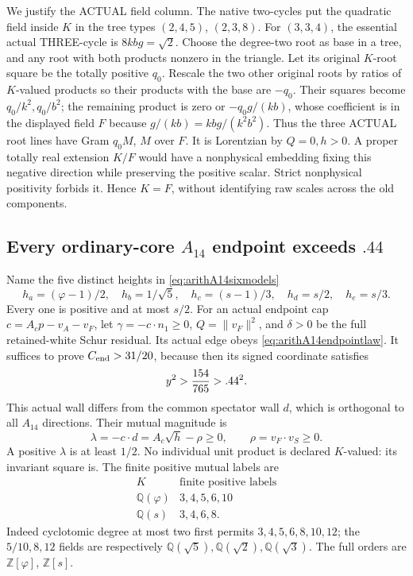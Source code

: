 We justify the ACTUAL field column.
The native two-cycles put the quadratic
field inside \(K\) in the tree types
\((2,4,5)\), \((2,3,8)\).
For \((3,3,4)\), the essential actual
THREE-cycle is \(8kbg=\sqrt2\).
Choose the degree-two root as base in a
tree, and any root with both products
nonzero in the triangle.
Let its original \(K\)-root square be
the totally positive \(q_0\).
Rescale the two other original roots by
ratios of \(K\)-valued products so their
products with the base are \(-q_0\).
Their squares become \(q_0/k^2,q_0/b^2\);
the remaining product is zero or
\(-q_0g/(kb)\), whose coefficient is in
the displayed field \(F\) because
\(g/(kb)=kbg/(k^2b^2)\).
Thus the three ACTUAL root lines have
Gram \(q_0M\), \(M\) over \(F\).
It is Lorentzian by \(Q=0,h>0\).
A proper totally real extension \(K/F\)
would have a nonphysical embedding fixing
this negative direction while preserving
the positive scalar.
Strict nonphysical positivity forbids it.
Hence \(K=F\), without identifying raw
scales across the old components.

\subsection{Every ordinary-core \(A_{14}\) endpoint exceeds \(.44\)}
\label{app:arithA14ordinaryends}

Name the five distinct heights in
\eqref{eq:arithA14sixmodels}
\[
 h_a=(\varphi-1)/2,\quad h_b=1/\sqrt5,\quad
 h_c=(s-1)/3,\quad h_d=s/2,\quad h_e=s/3 .
\]
Every one is positive and at most \(s/2\).
For an actual endpoint cap
\(c=A_cp-v_A-v_F\), let
\(\gamma=-c\cdot n_1\ge0\),
\(Q=\|v_F\|^2\), and \(\delta>0\)
be the full retained-white Schur residual.
Its actual edge obeys
\eqref{eq:arithA14endpointlaw}.
It suffices to prove \(C_{\rm end}>31/20\),
because then its signed coordinate satisfies
\[
                           y^2>{154\over765}>.44^2 .
\]
This actual wall differs from the common
spectator wall \(d\), which is orthogonal
to all \(A_{14}\) directions.
Their mutual magnitude is
\[
                \lambda=-c\cdot d=A_c\sqrt h-\rho\ge0,
                         \qquad \rho=v_F\cdot v_S\ge0.
\tag{A14mut}\label{eq:arithA14ordinarymutual}
\]
A positive \(\lambda\) is at least \(1/2\).
No individual unit product is declared
\(K\)-valued: its invariant square is.
The finite positive mutual labels are
\[
 \begin{array}{c|c}
 K&\text{finite positive labels}\\ \hline
 \mathbb Q(\varphi)&3,4,5,6,10\\
 \mathbb Q(s)&3,4,6,8 .
 \end{array}
\]
Indeed cyclotomic degree at most two first
permits \(3,4,5,6,8,10,12\);
the \(5/10,8,12\) fields are respectively
\(\mathbb Q(\sqrt5),\mathbb Q(\sqrt2),\mathbb Q(\sqrt3)\).
The full orders are \(\mathbb Z[\varphi]\),
\(\mathbb Z[s]\).

